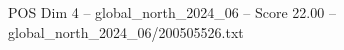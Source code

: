 \begin{textsample}{POS Dim 4 – global\_north\_2024\_06 – Score 22.00 – global\_north\_2024\_06/200505526.txt}
\end{textsample}
